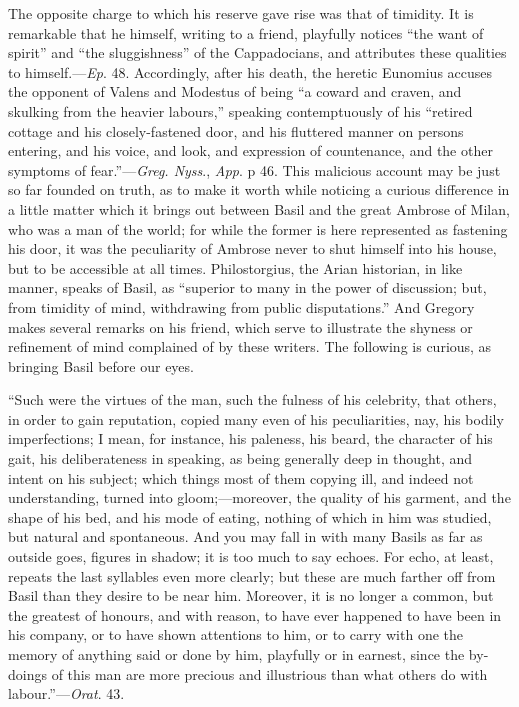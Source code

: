 The opposite charge to which his reserve gave rise was that of
timidity. It is remarkable that he himself, writing to a friend,
playfully notices ``the want of spirit'' and ``the
sluggishness'' of the Cappadocians, and attributes these qualities
to himself.—\emph{Ep}. 48. Accordingly, after his death, the heretic
Eunomius accuses the opponent of Valens and Modestus of being ``a
coward and craven, and skulking from the heavier labours,''
speaking contemptuously of his ``retired cottage and his
closely-fastened door, and his fluttered manner on persons entering,
and his voice, and look, and expression of countenance, and the other
symptoms of fear.''—\emph{Greg. Nyss}., \emph{App}. p 46. This
malicious account may be just so far founded on truth, as to make it
worth while noticing a curious difference in a little matter which it
brings out between Basil and the great Ambrose of Milan, who was a man
of the world; for while the former is here represented as fastening
his door, it was the peculiarity of Ambrose never to shut himself into
his house, but to be accessible at all times. Philostorgius, the Arian
historian, in like manner, speaks of Basil, as ``superior to many
in the power of discussion; but, from timidity of mind, withdrawing
from public disputations.'' And Gregory makes several remarks on
his friend, which serve to illustrate the shyness or refinement of
mind complained of by these writers. The following is curious, as
bringing Basil before our eyes.

``Such were the virtues of the man, such the fulness of his
celebrity, that others, in order to gain
reputation, copied many even of his peculiarities, nay, his bodily
imperfections; I mean, for instance, his paleness, his beard, the
character of his gait, his deliberateness in speaking, as being
generally deep in thought, and intent on his subject; which things
most of them copying ill, and indeed not understanding, turned into
gloom;—moreover, the quality of his garment, and the shape of his
bed, and his mode of eating, nothing of which in him was studied, but
natural and spontaneous. And you may fall in with many Basils as far
as outside goes, figures in shadow; it is too much to say echoes. For
echo, at least, repeats the last syllables even more clearly; but
these are much farther off from Basil than they desire to be near him.
Moreover, it is no longer a common, but the greatest of honours, and
with reason, to have ever happened to have been in his company, or to
have shown attentions to him, or to carry with one the memory of
anything said or done by him, playfully or in earnest, since the
by-doings of this man are more precious and illustrious than what
others do with labour.''—\emph{Orat}. 43.

